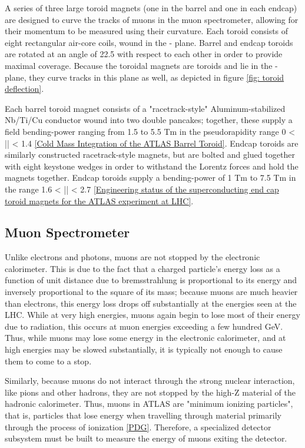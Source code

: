 A series of three large toroid magnets (one in the barrel and one in each endcap) are designed to curve the tracks of muons in the muon spectrometer, allowing for their momentum to be measured using their curvature. Each toroid consists of eight rectangular air-core coils, wound in the \R - \z plane. Barrel and endcap toroids are rotated at an angle of 22.5 \deg with respect to each other in order to provide maximal coverage. Because the toroidal magnets are toroids and lie in the \R - \z plane, they curve tracks in this plane as well, as depicted in figure \ref{fig: toroid deflection}.

Each barrel toroid magnet consists of a "racetrack-style" Aluminum-stabilized Nb/Ti/Cu conductor wound into two double pancakes; together, these supply a field bending-power ranging from 1.5 to 5.5 Tm  in the pseudorapidity range  0 < |\eta | < 1.4 \ref{Cold Mass Integration of the ATLAS Barrel Toroid}. Endcap toroids are similarly constructed racetrack-style magnets, but are bolted and glued together with eight keystone wedges in order to withstand the Lorentz forces and hold the magnets together. Endcap toroids supply a bending-power of 1 Tm to 7.5 Tm in the range 1.6 < |\eta | < 2.7 \ref{Engineering status of the superconducting end cap toroid magnets for the ATLAS experiment at LHC}.

\subsection{Muon Spectrometer} \label{sec:Musyst}
 
Unlike electrons and photons, muons are not stopped by the electronic calorimeter. This is due to the fact that a charged particle's energy loss as a function of unit distance due to bremsstrahlung is proportional to its energy and inversely proportional to the square of its mass; because muons are much heavier than electrons, this energy loss drops off substantially at the energies seen at the LHC. While at very high energies, muons again begin to lose most of their energy due to radiation, this occurs at muon energies exceeding a few hundred GeV. Thus, while muons may lose some energy in the electronic calorimeter, and at high energies may be slowed substantially, it is typically not enough to cause them to come to a stop. 

Similarly, because muons do not interact through the strong nuclear interaction, like pions and other hadrons, they are not stopped by the high-Z material of the hadronic calorimeter. Thus, muons in ATLAS are "minimum ionizing particles", that is, particles that lose energy when travelling through material primarily through the process of ionization \ref{PDG}. Therefore, a specialized detector subsystem must be built to measure the energy of muons exiting the detector.

